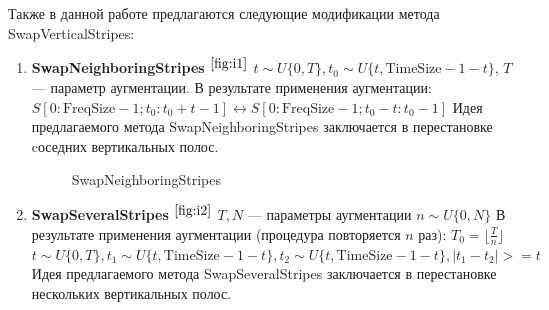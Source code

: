 \documentclass[12pt, fleqn]{article}
\begin{document}
Также в данной работе предлагаются следующие модификации метода \newline
SwapVerticalStripes:

\begin{enumerate}
    \item \textbf{SwapNeighboringStripes} $^{\ref{fig:i1}}$ \newline
        $t \sim U\{0, T\}, t_0 \sim U\{t, \text{TimeSize} - 1 - t\}$, $T$ --- параметр аугментации. \newline
    	В результате применения аугментации: \newline
    	$S[0:\text{FreqSize} - 1; t_0: t_0 + t - 1] \leftrightarrow S[0:\text{FreqSize} - 1; t_0 - t: t_0 - 1]$ \newline Идея предлагаемого метода SwapNeighboringStripes заключается в перестановке cоседних вертикальных полос.
    	\begin{figure}[ht!]
    	\caption{SwapNeighboringStripes}
    	\label{fig:i1}
        \end{figure}
    \item \textbf{SwapSeveralStripes} $^{\ref{fig:i2}}$ \newline
        $T, N$ --- параметры аугментации \newline
        $n \sim U\{0, N\}$ \newline
    	В результате применения аугментации (процедура повторяется $n$ раз): \newline
    	$T_0 = \lfloor \frac{T}{n} \rfloor$ \newline
    	$t \sim U\{0, T\}, t_1 \sim U\{t, \text{TimeSize} - 1 - t\}, t_2 \sim U\{t, \text{TimeSize} - 1 - t\}, |t_1 - t_2| >= t $ \newline Идея предлагаемого метода SwapSeveralStripes заключается в перестановке нескольких вертикальных полос.
    	\begin{figure}[ht!]

\end{figure}
\end{enumerate}
\end{document}
